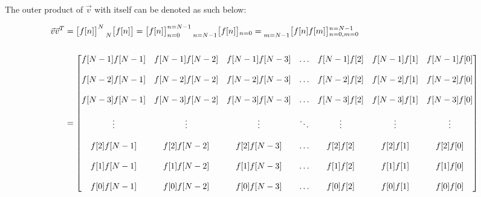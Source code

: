 \documentclass{article}
\begin{document}
The outer product of $\vec{v}$ with itself can be denoted as such below:

\begin{align*}
    \vec{v}\vec{v}^{T}&= \begin{bmatrix} f[n] \end{bmatrix}^{N}\prescript{}{N}{\begin{bmatrix} f[n] \end{bmatrix}}
                       = \begin{bmatrix} f[n] \end{bmatrix}^{n = N - 1}_{n = 0}\prescript{}{n = N - 1}{\begin{bmatrix} f[n] \end{bmatrix}}_{n = 0}
                       = \prescript{}{m = N - 1}{\begin{bmatrix} f[n]f[m] \end{bmatrix}}^{n = N - 1}_{n = 0, m = 0} \\ \\ 
                      &= \begin{bmatrix}
                            f[N - 1]f[N - 1] & f[N - 1]f[N - 2] & f[N - 1]f[N - 3] & \ldots & f[N - 1]f[2] & f[N - 1]f[1] & f[N - 1]f[0] \\ \\
                            f[N - 2]f[N - 1] & f[N - 2]f[N - 2] & f[N - 2]f[N - 3] & \ldots & f[N - 2]f[2] & f[N - 2]f[1] & f[N - 2]f[0] \\ \\
                            f[N - 3]f[N - 1] & f[N - 3]f[N - 2] & f[N - 3]f[N - 3] & \ldots & f[N - 3]f[2] & f[N - 3]f[1] & f[N - 3]f[0] \\ \\
                                      \vdots &           \vdots &           \vdots & \ddots &       \vdots &       \vdots &       \vdots \\ \\
                            f[    2]f[N - 1] & f[    2]f[N - 2] & f[    2]f[N - 3] & \ldots & f[    2]f[2] & f[    2]f[1] & f[    2]f[0] \\ \\
                            f[    1]f[N - 1] & f[    1]f[N - 2] & f[    1]f[N - 3] & \ldots & f[    1]f[2] & f[    1]f[1] & f[    1]f[0] \\ \\
                            f[    0]f[N - 1] & f[    0]f[N - 2] & f[    0]f[N - 3] & \ldots & f[    0]f[2] & f[    0]f[1] & f[    0]f[0]
                           \end{bmatrix} \\ \\ 
  \end{align*}
\end{document}
